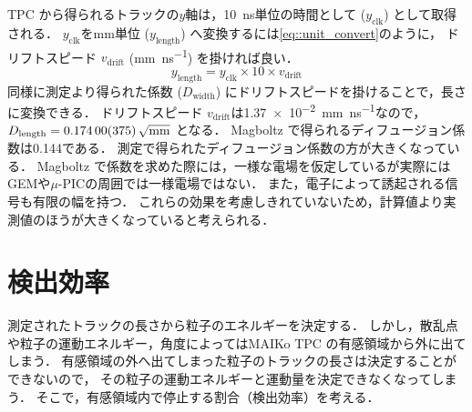 \documentclass[../master]{subfiles}
\begin{document}
TPC から得られるトラックの$y$軸は，\SI{10}{\nano\second}単位の時間として ($y_{\text{clk}}$) として取得される．
$y_{\text{clk}}$を\si{\milli\metre}単位 ($y_{\text{length}}$) へ変換するには\eqref{eq::unit_convert}のように，
ドリフトスピード $v_{\text{drift}}$ (\si{\milli\metre\per\nano\second}) を掛ければ良い．
\begin{equation}
  y_{\text{length}} = y_{\text{clk}}\times 10\times v_{\text{drift}} \label{eq::unit_convert}
\end{equation}
同様に測定より得られた係数 ($D_{\text{width}}$) にドリフトスピードを掛けることで，長さに変換できる．
ドリフトスピード $v_{\text{drift}}$は\SI{1.37e-2}{\milli\metre\per\nano\second}なので，
$D_{\text{length}} = \SI{0.174\pm0.00375}{\sqrt{\milli\metre}}$
となる．
Magboltz で得られるディフュージョン係数は\SI{0.144}{\sqrt{\milli\metre}}である．
測定で得られたディフュージョン係数の方が大きくなっている．
Magboltz で係数を求めた際には，一様な電場を仮定しているが実際にはGEMや$\mu$-PICの周囲では一様電場ではない．
また，電子によって誘起される信号も有限の幅を持つ．
これらの効果を考慮しきれていないため，計算値より実測値のほうが大きくなっていると考えられる．

\section{検出効率}
測定されたトラックの長さから粒子のエネルギーを決定する．
しかし，散乱点や粒子の運動エネルギー，角度によってはMAIKo TPC の有感領域から外に出てしまう．
有感領域の外へ出てしまった粒子のトラックの長さは決定することができないので，
その粒子の運動エネルギーと運動量を決定できなくなってしまう．
そこで，有感領域内で停止する割合（検出効率）を考える．
\end{document}
